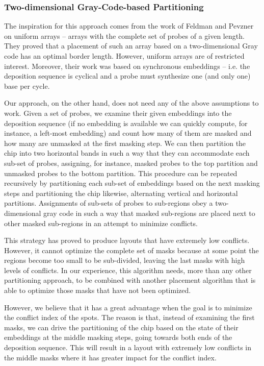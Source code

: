 \documentclass{article}
\begin{document}
\subsubsection{Two-dimensional Gray-Code-based Partitioning}

The inspiration for this approach comes from the work of Feldman and Pevzner \cite{FELDMAN93} on uniform arrays -- arrays with the complete set of probes of a given length. They proved that a placement of such an array based on a two-dimensional Gray code has an optimal border length. However, uniform arrays are of restricted interest. Moreover, their work was based on synchronous embeddings -- i.e. the deposition sequence is cyclical and a probe must synthesize one (and only one) base per cycle. 

Our approach, on the other hand, does not need any of the above assumptions to work. Given a set of probes, we examine their given embeddings into the deposition sequence (if no embedding is available we can quickly compute, for instance, a left-most embedding) and count how many of them are masked and how many are unmasked at the first masking step. We can then partition the chip into two horizontal bands in such a way that they can accommodate each sub-set of probes, assigning, for instance, masked probes to the top partition and unmasked probes to the bottom partition. This procedure can be repeated recursively by partitioning each sub-set of embeddings based on the next masking steps and partitioning the chip likewise, alternating vertical and horizontal partitions. Assignments of sub-sets of probes to sub-regions obey a two-dimensional gray code in such a way that masked sub-regions are placed next to other masked sub-regions in an attempt to minimize conflicts. 

This strategy has proved to produce layouts that have extremely low conflicts. However, it cannot optimize the complete set of masks because at some point the regions become too small to be sub-divided, leaving the last masks with high levels of conflicts. In our experience, this algorithm needs, more than any other partitioning approach, to be combined with another placement algorithm that is able to optimize those masks that have not been optimized. 

However, we believe that it has a great advantage when the goal is to minimize the conflict index of the spots. The reason is that, instead of examining the first masks, we can drive the partitioning of the chip based on the state of their embeddings at the middle masking steps, going towards both ends of the deposition sequence. This will result in a layout with extremely low conflicts in the middle masks where it has greater impact for the conflict index. 
\end{document}

